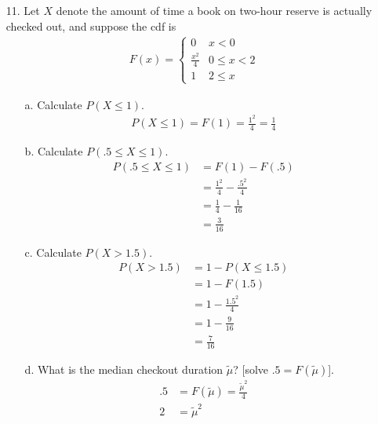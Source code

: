 \documentclass[letterpaper,12pt]{article}
\begin{document}
\maketitle

\begin{enumerate}
  \item[11.]
    Let $X$ denote the amount of time a book on two-hour reserve is actually checked out, and suppose the cdf is
    \begin{align*}
      F(x) = \begin{cases}
        0             & x < 0 \\
        \frac{x^2}{4} & 0 \le x < 2 \\
        1             & 2 \le x
      \end{cases}
    \end{align*}
    \begin{enumerate}
      \item[a.]
        Calculate $P(X \le 1)$.
        \begin{align*}
          P(X \le 1) = F(1) = \frac{1^2}{4} = \frac{1}{4}
        \end{align*}
      \item[b.]
        Calculate $P(.5 \le X \le 1)$.
        \begin{align*}
          P(.5 \le X \le 1) &= F(1) - F(.5) \\
          &= \frac{1^2}{4} - \frac{.5^2}{4} \\
          &= \frac{1}{4} - \frac{1}{16} \\
          &= \frac{3}{16}
        \end{align*}
      \item[c.]
        Calculate $P(X > 1.5)$.
        \begin{align*}
          P(X > 1.5) &= 1 - P(X \le 1.5) \\
          &= 1 - F(1.5) \\
          &= 1 - \frac{1.5^2}{4} \\
          &= 1 - \frac{9}{16} \\
          &= \frac{7}{16}
        \end{align*}
      \item[d.]
        What is the median checkout duration $\tilde{\mu}$? [solve $.5 = F(\tilde{\mu})$].
        \begin{align*}
          .5 &= F(\tilde{\mu}) = \frac{\tilde{\mu}^2}{4} \\
          2 &= \tilde{\mu}^2 \\

\end{align*}
\end{enumerate}
\end{enumerate}
\end{document}
